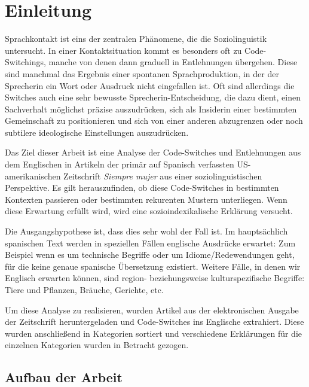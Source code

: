 \section{Einleitung}


Sprachkontakt ist eins der zentralen Phänomene, die die Soziolinguistik untersucht.
In einer Kontaktsituation kommt es besonders oft zu Code-Switchings, manche von denen dann graduell in Entlehnungen übergehen.
Diese sind manchmal das Ergebnis einer spontanen Sprachproduktion, in der der Sprecherin ein Wort oder Ausdruck nicht eingefallen ist.
Oft sind allerdings die Switches auch eine sehr bewusste Sprecherin-Entscheidung, die dazu dient, einen Sachverhalt möglichst präzise auszudrücken,
sich als Insiderin einer bestimmten Gemeinschaft zu positionieren und sich von einer anderen abzugrenzen oder noch subtilere ideologische Einstellungen auszudrücken.


Das Ziel dieser Arbeit ist eine Analyse der Code-Switches und Entlehnungen aus dem Englischen in Artikeln der primär auf Spanisch verfassten US-amerikanischen Zeitschrift \textit{Siempre mujer} aus einer soziolinguistischen Perspektive.
Es gilt herauszufinden, ob diese Code-Switches in bestimmten Kontexten passieren oder bestimmten rekurenten Mustern unterliegen.
Wenn diese Erwartung erfüllt wird, wird eine sozioindexikalische Erklärung versucht.

Die Ausgangshypothese ist, dass dies sehr wohl der Fall ist.
Im hauptsächlich spanischen Text werden in speziellen Fällen englische Ausdrücke erwartet:
Zum Beispiel wenn es um technische Begriffe oder um Idiome/Redewendungen geht, für die keine genaue spanische Übersetzung existiert.
Weitere Fälle, in denen wir Englisch erwarten können, sind region- beziehungsweise kulturspezifische Begriffe: Tiere und Pflanzen, Bräuche, Gerichte, etc.

Um diese Analyse zu realisieren, wurden Artikel aus der elektronischen Ausgabe der Zeitschrift heruntergeladen und Code-Switches ins Englische extrahiert.
Diese wurden anschließend in Kategorien sortiert und verschiedene Erklärungen für die einzelnen Kategorien wurden in Betracht gezogen.


\subsection{Aufbau der Arbeit}

